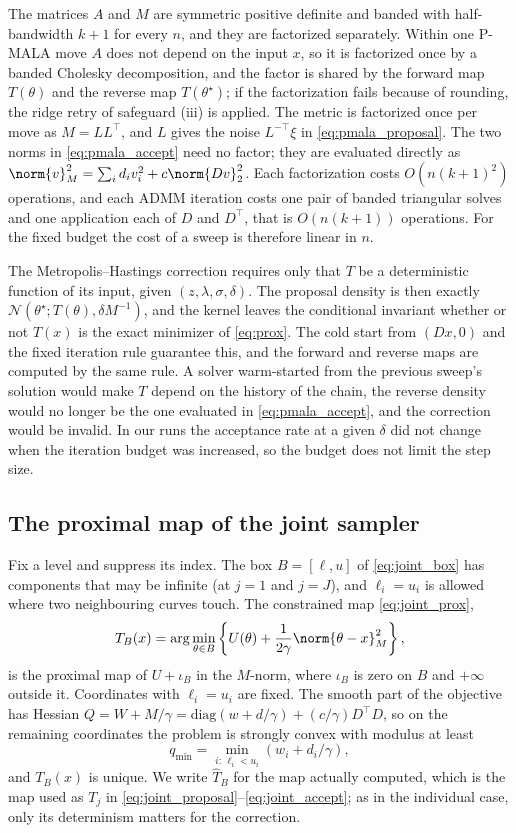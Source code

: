 The matrices $A$ and $M$ are symmetric positive definite and banded with half-bandwidth $k+1$ for every $n$, and they are factorized separately. Within one P-MALA move $A$ does not depend on the input $x$, so it is factorized once by a banded Cholesky decomposition, and the factor is shared by the forward map $T(\theta)$ and the reverse map $T(\theta^\star)$; if the factorization fails because of rounding, the ridge retry of safeguard (iii) is applied. The metric is factorized once per move as $M = LL^\top$, and $L$ gives the noise $L^{-\top}\xi$ in \eqref{eq:pmala_proposal}. The two norms in \eqref{eq:pmala_accept} need no factor; they are evaluated directly as $\norm{v}_M^2 = \sum_i d_i v_i^2 + c\norm{Dv}_2^2$. Each factorization costs $O(n(k+1)^2)$ operations, and each ADMM iteration costs one pair of banded triangular solves and one application each of $D$ and $D^\top$, that is $O(n(k+1))$ operations. For the fixed budget the cost of a sweep is therefore linear in $n$.

The Metropolis--Hastings correction requires only that $T$ be a deterministic function of its input, given $(z, \lambda, \sigma, \delta)$. The proposal density is then exactly $\mathcal{N}(\theta^\star; T(\theta), \delta M^{-1})$, and the kernel leaves the conditional invariant whether or not $T(x)$ is the exact minimizer of \eqref{eq:prox}. The cold start from $(Dx, 0)$ and the fixed iteration rule guarantee this, and the forward and reverse maps are computed by the same rule. A solver warm-started from the previous sweep's solution would make $T$ depend on the history of the chain, the reverse density would no longer be the one evaluated in \eqref{eq:pmala_accept}, and the correction would be invalid. In our runs the acceptance rate at a given $\delta$ did not change when the iteration budget was increased, so the budget does not limit the step size.

\subsection{The proximal map of the joint sampler}
\label{app:pmala:boxsolver}

Fix a level and suppress its index. The box $B = [\ell, u]$ of \eqref{eq:joint_box} has components that may be infinite (at $j = 1$ and $j = J$), and $\ell_i = u_i$ is allowed where two neighbouring curves touch. The constrained map \eqref{eq:joint_prox},
\[
T_B(x) = \arg\min_{\theta \in B}\left\{U(\theta) + \frac{1}{2\gamma}\norm{\theta - x}_M^2\right\},
\]
is the proximal map of $U + \iota_B$ in the $M$-norm, where $\iota_B$ is zero on $B$ and $+\infty$ outside it. Coordinates with $\ell_i = u_i$ are fixed. The smooth part of the objective has Hessian $Q = W + M/\gamma = \mathrm{diag}(w + d/\gamma) + (c/\gamma)D^\top D$, so on the remaining coordinates the problem is strongly convex with modulus at least
\[
q_{\min} = \min_{i:\,\ell_i < u_i}\left(w_i + d_i/\gamma\right),
\]
and $T_B(x)$ is unique. We write $\widehat T_B$ for the map actually computed, which is the map used as $T_j$ in \eqref{eq:joint_proposal}--\eqref{eq:joint_accept}; as in the individual case, only its determinism matters for the correction.

